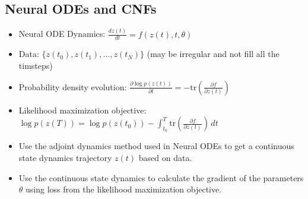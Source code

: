 \documentclass[12pt]{article}
\begin{document}
\subsection{Neural ODEs and CNFs}
\begin{itemize}
    \item Neural ODE Dynamics: $\frac{dz(t)}{dt} = f(z(t), t, \theta)$
    \item Data: $\{z(t_0), z(t_1), \ldots, z(t_N)\}$ (may be irregular and not fill all the timsteps)
    \item Probability density evolution: $\frac{\partial \log p(z(t))}{\partial t} = -\mathrm{tr}\left(\frac{\partial f}{\partial z(t)}\right)$
    \item Likelihood maximization objective: $\log p(z(T)) = \log p(z(t_0)) - \int_{t_0}^{T} \mathrm{tr}\left(\frac{\partial f}{\partial z(t)}\right) \, dt$
    \item Use the adjoint dynamics method used in Neural ODEs to get a continuous state dynamics trajectory $z(t)$ based on data. 
    \item Use the continuous state dynamics to calculate the gradient of the parameters $\theta$ using loss from the likelihood maximization objective.
\end{itemize}
\end{document}
